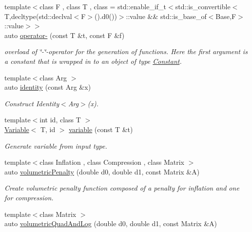 \begin{DoxyCompactItemize}
{\footnotesize template$<$class F , class T , class  = std\-::enable\-\_\-if\-\_\-t$<$std\-::is\-\_\-convertible$<$\-T,decltype(std\-::declval$<$\-F$>$().\-d0())$>$\-::value \&\&                                     std\-::is\-\_\-base\-\_\-of$<$\-Base,\-F$>$\-::value$>$$>$ }\\auto \hyperlink{namespaceFunG_a7f522d98a8d5bc8c3b11599d3136ded4}{operator-\/} (const T \&t, const F \&f)
\begin{DoxyCompactList}\small\item\em overload of \char`\"{}-\/\char`\"{}-\/operator for the generation of functions. Here the first argument is a constant that is wrapped in to an object of type \hyperlink{structFunG_1_1Constant}{Constant}. \end{DoxyCompactList}\item 
\hypertarget{namespaceFunG_a165e879e76d3a2a8906938f3658445ce}{{\footnotesize template$<$class Arg $>$ }\\auto \hyperlink{namespaceFunG_a165e879e76d3a2a8906938f3658445ce}{identity} (const Arg \&x)}\label{namespaceFunG_a165e879e76d3a2a8906938f3658445ce}

\begin{DoxyCompactList}\small\item\em Construct Identity$<$\-Arg$>$(x). \end{DoxyCompactList}\item 
\hypertarget{namespaceFunG_a1c474456411f028e14eab67ff6eebe0c}{{\footnotesize template$<$int id, class T $>$ }\\\hyperlink{structFunG_1_1Variable}{Variable}$<$ T, id $>$ \hyperlink{namespaceFunG_a1c474456411f028e14eab67ff6eebe0c}{variable} (const T \&t)}\label{namespaceFunG_a1c474456411f028e14eab67ff6eebe0c}

\begin{DoxyCompactList}\small\item\em Generate variable from input type. \end{DoxyCompactList}\item 
\hypertarget{namespaceFunG_ad26faeb264bb4b1cd7e70f3811c366c8}{{\footnotesize template$<$class Inflation , class Compression , class Matrix $>$ }\\auto \hyperlink{namespaceFunG_ad26faeb264bb4b1cd7e70f3811c366c8}{volumetric\-Penalty} (double d0, double d1, const Matrix \&A)}\label{namespaceFunG_ad26faeb264bb4b1cd7e70f3811c366c8}

\begin{DoxyCompactList}\small\item\em Create volumetric penalty function composed of a penalty for inflation and one for compression. \end{DoxyCompactList}\item 
\hypertarget{namespaceFunG_aaf30b9c36ed86e01b94f6b7c1d95cae8}{{\footnotesize template$<$class Matrix $>$ }\\auto \hyperlink{namespaceFunG_aaf30b9c36ed86e01b94f6b7c1d95cae8}{volumetric\-Quad\-And\-Log} (double d0, double d1, const Matrix \&A)}\label{namespaceFunG_aaf30b9c36ed86e01b94f6b7c1d95cae8}


\end{DoxyCompactItemize}
